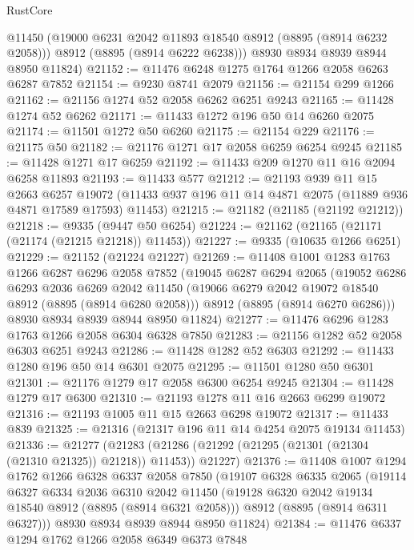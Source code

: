 \begin{lexlean}{RustCore}
\begin{coremodule}
        @11450
        (@19000 @6231 @2042 @11893 @18540 @8912 (@8895 (@8914 @6232 @2058)))
        @8912
        (@8895 (@8914 @6222 @6238)))
      @8930
      @8934
      @8939
      @8944
      @8950
      @11824)
@21152 := @11476 @6248 @1275 @1764 @1266 @2058 @6263 @6287 @7852
@21154 := @9230 @8741 @2079
@21156 := @21154 @299 @1266
@21162 := @21156 @1274 @52 @2058 @6262 @6251 @9243
@21165 := @11428 @1274 @52 @6262
@21171 := @11433 @1272 @196 @50 @14 @6260 @2075
@21174 := @11501 @1272 @50 @6260
@21175 := @21154 @229
@21176 := @21175 @50
@21182 := @21176 @1271 @17 @2058 @6259 @6254 @9245
@21185 := @11428 @1271 @17 @6259
@21192 := @11433 @209 @1270 @11 @16 @2094 @6258 @11893
@21193 := @11433 @577
@21212 := @21193
    @939
    @11
    @15
    @2663
    @6257
    @19072
    (@11433 @937 @196 @11 @14 @4871 @2075 (@11889 @936 @4871 @17589 @17593) @11453)
@21215 := @21182 (@21185 (@21192 @21212))
@21218 := @9335 (@9447 @50 @6254)
@21224 := @21162 (@21165 (@21171 (@21174 (@21215 @21218)) @11453))
@21227 := @9335 (@10635 @1266 @6251)
@21229 := @21152 (@21224 @21227)
@21269 := @11408
    @1001
    @1283
    @1763
    @1266
    @6287
    @6296
    @2058
    @7852
    (@19045
      @6287
      @6294
      @2065
      (@19052
        @6286
        @6293
        @2036
        @6269
        @2042
        @11450
        (@19066 @6279 @2042 @19072 @18540 @8912 (@8895 (@8914 @6280 @2058)))
        @8912
        (@8895 (@8914 @6270 @6286)))
      @8930
      @8934
      @8939
      @8944
      @8950
      @11824)
@21277 := @11476 @6296 @1283 @1763 @1266 @2058 @6304 @6328 @7850
@21283 := @21156 @1282 @52 @2058 @6303 @6251 @9243
@21286 := @11428 @1282 @52 @6303
@21292 := @11433 @1280 @196 @50 @14 @6301 @2075
@21295 := @11501 @1280 @50 @6301
@21301 := @21176 @1279 @17 @2058 @6300 @6254 @9245
@21304 := @11428 @1279 @17 @6300
@21310 := @21193 @1278 @11 @16 @2663 @6299 @19072
@21316 := @21193 @1005 @11 @15 @2663 @6298 @19072
@21317 := @11433 @839
@21325 := @21316 (@21317 @196 @11 @14 @4254 @2075 @19134 @11453)
@21336 := @21277
    (@21283 (@21286 (@21292 (@21295 (@21301 (@21304 (@21310 @21325)) @21218)) @11453)) @21227)
@21376 := @11408
    @1007
    @1294
    @1762
    @1266
    @6328
    @6337
    @2058
    @7850
    (@19107
      @6328
      @6335
      @2065
      (@19114
        @6327
        @6334
        @2036
        @6310
        @2042
        @11450
        (@19128 @6320 @2042 @19134 @18540 @8912 (@8895 (@8914 @6321 @2058)))
        @8912
        (@8895 (@8914 @6311 @6327)))
      @8930
      @8934
      @8939
      @8944
      @8950
      @11824)
@21384 := @11476 @6337 @1294 @1762 @1266 @2058 @6349 @6373 @7848

\end{coremodule}
\end{lexlean}
